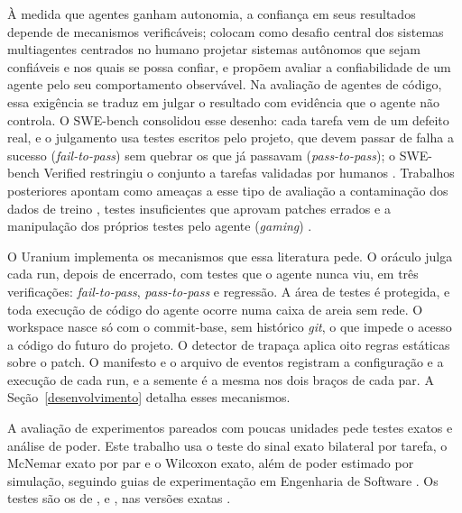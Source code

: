 À medida que agentes ganham autonomia, a confiança em seus resultados depende de mecanismos verificáveis; \cite{Trustworthy2023} colocam como desafio central dos sistemas multiagentes centrados no humano projetar sistemas autônomos que sejam confiáveis e nos quais se possa confiar, e propõem avaliar a confiabilidade de um agente pelo seu comportamento observável. Na avaliação de agentes de código, essa exigência se traduz em julgar o resultado com evidência que o agente não controla. O SWE-bench \citep{Jimenez2024SWEbench} consolidou esse desenho: cada tarefa vem de um defeito real, e o julgamento usa testes escritos pelo projeto, que devem passar de falha a sucesso (\textit{fail-to-pass}) sem quebrar os que já passavam (\textit{pass-to-pass}); o SWE-bench Verified restringiu o conjunto a tarefas validadas por humanos \citep{OpenAI2024SWEbenchVerified}. Trabalhos posteriores apontam como ameaças a esse tipo de avaliação a contaminação dos dados de treino \citep{Jain2025LiveCodeBench}, testes insuficientes que aprovam patches errados \citep{Liu2023EvalPlus, Yu2025UTBoost, Wang2026SolvedIssues} e a manipulação dos próprios testes pelo agente (\textit{gaming}) \citep{Zhong2026ImpossibleBench}.

O Uranium implementa os mecanismos que essa literatura pede. O oráculo julga cada run, depois de encerrado, com testes que o agente nunca viu, em três verificações: \textit{fail-to-pass}, \textit{pass-to-pass} e regressão. A área de testes é protegida, e toda execução de código do agente ocorre numa caixa de areia sem rede. O workspace nasce só com o commit-base, sem histórico \textit{git}, o que impede o acesso a código do futuro do projeto. O detector de trapaça aplica oito regras estáticas sobre o patch. O manifesto e o arquivo de eventos registram a configuração e a execução de cada run, e a semente é a mesma nos dois braços de cada par. A Seção~\ref{desenvolvimento} detalha esses mecanismos.

A avaliação de experimentos pareados com poucas unidades pede testes exatos e análise de poder. Este trabalho usa o teste do sinal exato bilateral por tarefa, o McNemar exato por par e o Wilcoxon exato, além de poder estimado por simulação, seguindo guias de experimentação em Engenharia de Software \citep{Wohlin2012Experimentation, Arcuri2014Hitchhiker}. Os testes são os de \cite{Dixon1946SignTest}, \cite{McNemar1947} e \cite{Wilcoxon1945}, nas versões exatas \citep{Hollander2014Nonparametric, Fagerland2013McNemar}.

